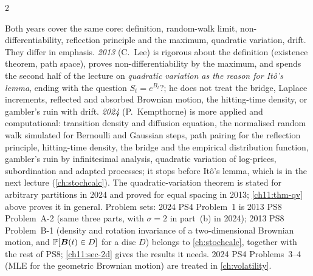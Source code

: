 \begin{paracol}{2}
\begin{coursenote}
Both years cover the same core: definition, random-walk limit, non-differentiability, reflection principle and the maximum, quadratic variation, drift. They differ
in emphasis. \emph{2013} (C.~Lee) is rigorous about the definition (existence theorem, path space), proves non-differentiability by the maximum, and spends the second half of the lecture on
\emph{quadratic variation as the reason for It\^o's lemma}, ending with the question $S_t=e^{B_t}$?; he does not treat the bridge,
Laplace increments, reflected and absorbed Brownian motion, the hitting-time density, or gambler's ruin with drift. \emph{2024}
(P.~Kempthorne) is more applied and computational: transition density and diffusion equation, the normalised random walk simulated
for Bernoulli and Gaussian steps, path pairing for the reflection principle, hitting-time density,
the bridge and the empirical distribution function, gambler's ruin by infinitesimal analysis, quadratic variation of log-prices, subordination and adapted processes; it
stops before It\^o's lemma, which is in the next lecture (\cref{ch:stochcalc}). The quadratic-variation theorem is stated for arbitrary partitions in 2024 and proved for
equal spacing in 2013; \cref{ch11:thm-qv} above proves it in general. Problem sets: 2024 PS4 Problem~1 is 2013 PS8 Problem~A-2 (same three parts, with $\sigma=2$ in part~(b)
in 2024); 2013 PS8 Problem~B-1 (density and rotation invariance of a two-dimensional Brownian motion, and $\mathbb{P}[\bm B(t)\in D]$ for a disc $D$) belongs to \cref{ch:stochcalc}, together with the rest of
PS8; \cref{ch11:sec-2d} gives the results it needs. 2024 PS4 Problems~3--4 (MLE for the geometric Brownian motion) are treated in \cref{ch:volatility}.
\end{coursenote}


\end{paracol}
